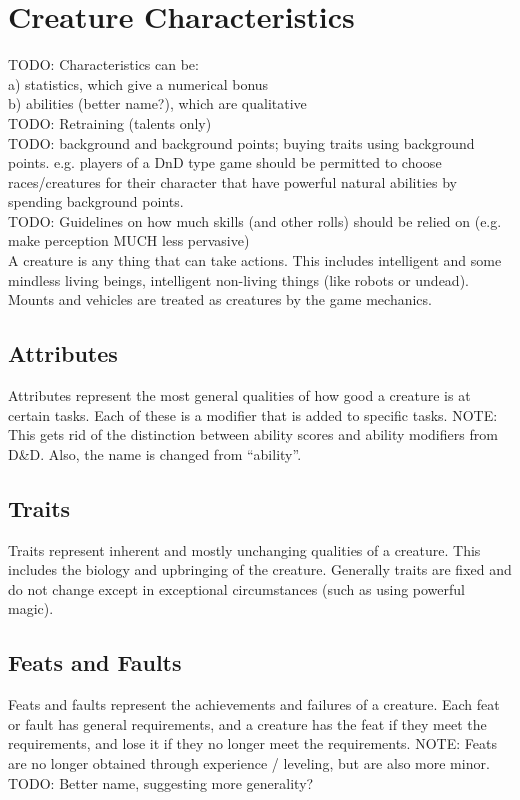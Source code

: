 \documentclass[letterpaper,titlepage,openany,twocolumn]{book}
\begin{document}
\chapter{Creature Characteristics}
TODO: Characteristics can be:\\
	a) statistics, which give a numerical bonus\\
	b) abilities (better name?), which are qualitative\\
TODO: Retraining (talents only)\\
TODO: background and background points; buying traits using background points. e.g. players of a DnD type game should be permitted to choose races/creatures for their character that have powerful natural abilities by spending background points.\\
TODO: Guidelines on how much skills (and other rolls) should be relied on (e.g. make perception MUCH less pervasive)\\

A creature is any thing that can take actions. This includes intelligent and some mindless living beings, intelligent non-living things (like robots or undead). Mounts and vehicles are treated as creatures by the game mechanics.\\

\section{Attributes}
Attributes represent the most general qualities of how good a creature is at certain tasks. Each of these is a modifier that is added to specific tasks. NOTE: This gets rid of the distinction between ability scores and ability modifiers from D\&D. Also, the name is changed from “ability”.\\

\section{Traits}
Traits represent inherent and mostly unchanging qualities of a creature. This includes the biology and upbringing of the creature. Generally traits are fixed and do not change except in exceptional circumstances (such as using powerful magic).\\

\section{Feats and Faults}
Feats and faults represent the achievements and failures of a creature. Each feat or fault has general requirements, and a creature has the feat if they meet the requirements, and lose it if they no longer meet the requirements. NOTE: Feats are no longer obtained through experience / leveling, but are also more minor.\\
TODO: Better name, suggesting more generality?\\
\end{document}
